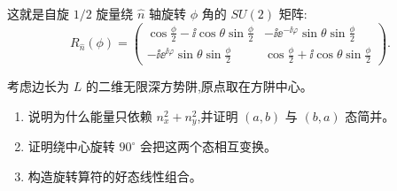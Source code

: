\begin{solution}
	这就是自旋 $1/2$ 旋量绕 $\hat n$ 轴旋转 $\phi$ 角的 $SU(2)$ 矩阵:
	\[
	\boxed{R_{\hat n}(\phi)=\begin{pmatrix}
	\cos\frac{\phi}{2}-\ii\cos\theta\sin\frac{\phi}{2}&-\ii \ee^{-\ii\varphi}\sin\theta\sin\frac{\phi}{2}\\
	-\ii \ee^{\ii\varphi}\sin\theta\sin\frac{\phi}{2}&\cos\frac{\phi}{2}+\ii\cos\theta\sin\frac{\phi}{2}
	\end{pmatrix}}.
	\]
	\end{solution}

\begin{question}
考虑边长为 $L$ 的二维无限深方势阱,原点取在方阱中心。
\begin{enumerate}
\item 说明为什么能量只依赖 $n_x^2+n_y^2$,并证明 $(a,b)$ 与 $(b,a)$ 态简并。
\item 证明绕中心旋转 $90^\circ$ 会把这两个态相互变换。
\item 构造旋转算符的好态线性组合。
\end{enumerate}
\end{question}
